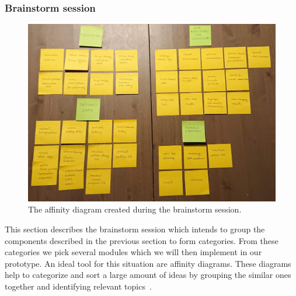         \subsubsection{Brainstorm session}

        \begin{figure}[!t]
            \centering
            \includegraphics[width=1\textwidth]{chapters/3_design/affinity}
            \caption{The affinity diagram created during the brainstorm session.}\label{fig:affinity}
        \end{figure}
        This section describes the brainstorm session which intends to group the components described in the previous section to form categories. From these categories we pick several modules which we will then implement in our prototype. An ideal tool for this situation are affinity diagrams. These diagrams help to categorize and sort a large amount of ideas by grouping the similar ones together and identifying relevant topics~\cite{Affinity}.

